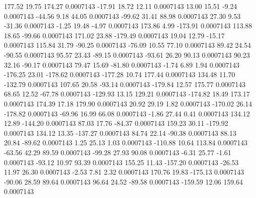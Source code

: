       177.52       19.75      174.27     0.0007143
      -17.91       18.72       12.11     0.0007143
       13.00       15.51       -9.24     0.0007143
      -44.56        9.18       44.05     0.0007143
      -99.62       31.41       88.98     0.0007143
       27.30        9.53      -31.36     0.0007143
       -1.25       19.48       -4.97     0.0007143
      173.86        4.99     -173.91     0.0007143
      113.88       18.65      -99.66     0.0007143
      171.02       23.88     -179.49     0.0007143
       19.04       12.79      -15.17     0.0007143
      115.84       31.79      -90.25     0.0007143
      -76.09       10.55       77.10     0.0007143
       89.42       24.54      -90.55     0.0007143
       95.57       23.43      -89.15     0.0007143
      -93.61       26.20       90.13     0.0007143
       90.23       32.16      -90.17     0.0007143
       79.47       15.69      -81.80     0.0007143
       -1.74        6.89        1.94     0.0007143
     -176.25       23.01     -178.62     0.0007143
     -177.28       10.74      177.44     0.0007143
      134.48       11.70     -132.79     0.0007143
      107.65       20.58      -93.14     0.0007143
     -179.84       12.57      175.77     0.0007143
       68.65       12.52      -67.78     0.0007143
     -129.93       13.15      129.21     0.0007143
     -174.82       18.49      173.17     0.0007143
      174.39       17.18      179.90     0.0007143
       20.92       29.19        1.82     0.0007143
     -170.02       26.14     -178.82     0.0007143
      -69.96       16.99       66.08     0.0007143
       -1.86       27.44        0.41     0.0007143
      134.12       12.89     -144.20     0.0007143
       87.03       17.76      -84.37     0.0007143
      159.23       30.11     -179.92     0.0007143
      134.12       13.35     -137.27     0.0007143
       84.74       22.14      -90.38     0.0007143
       88.13       20.84      -89.62     0.0007143
        1.25       25.13        1.03     0.0007143
     -110.88       10.64      113.84     0.0007143
      -63.56       42.29       89.59     0.0007143
      -99.28       27.93       90.08     0.0007143
       -6.31       25.77       -1.61     0.0007143
      -93.12       10.97       93.39     0.0007143
      155.25       11.43     -157.20     0.0007143
      -26.53       11.97       26.30     0.0007143
       -2.53        7.81        2.32     0.0007143
      170.76       19.83     -175.13     0.0007143
      -90.06       28.59       89.64     0.0007143
       96.64       24.52      -89.58     0.0007143
     -159.59       12.06      159.64     0.0007143
